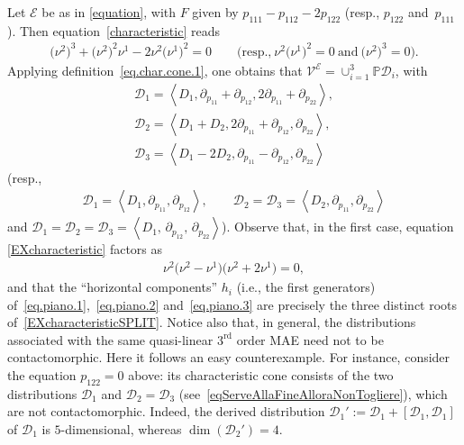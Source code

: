 \documentclass[10pt,a4paper]{amsart}
\newcommand{\D}{\mathcal{D}}
\newcommand{\M}{\mathcal{V}}
\newcommand{\E}{\mathcal{E}}
\newcommand{\Span}[1]{\left\langle #1 \right\rangle}
\renewcommand{\P}{\mathbb{P}}
\newcommand{\Rd}{^\textrm{rd}}
\newcommand{\w}{\nu}
\numberwithin{equation}{section}
\begin{document}
Let $\E$ be as in \eqref{equation}, with $F$ given by $p_{111}-p_{112}-2p_{122}$ (resp., $p_{122}$ and~$p_{111}$). Then equation~\eqref{characteristic} reads
\begin{gather}\label{EXcharacteristic}
\big(\w^2\big)^3+\big(\w^2\big)^2\w^1-2\w^2\big(\w^1\big)^2= 0\qquad \big(\textrm{resp.,} \ \w^2\big(\w^1\big)^2=0 \ \textrm{and}\ \big(\w^2\big)^3=0\big).
\end{gather}
Applying def\/inition~\eqref{eq.char.cone.1}, one obtains that $\M^\E=\cup_{i=1}^3\P\D_i$, with
\begin{gather}
\mathcal{D}_1 = \Span{ D_1 , \partial_{p_{11}}+\partial_{p_{12}}, 2\partial_{p_{11}}+\partial_{p_{22}}},\label{eq.piano.1}\\
\mathcal{D}_2 = \Span{ D_1 + D_2 ,2\partial_{p_{11}}+\partial_{p_{12}}, \partial_{p_{22}}},\label{eq.piano.2}\\
\mathcal{D}_3 = \Span{ D_1 - 2D_2 ,\partial_{p_{11}}-\partial_{p_{12}}, \partial_{p_{22}}}\label{eq.piano.3}
\end{gather}
(resp.,
 \begin{gather}
\mathcal{D}_1=\Span{ D_1,\partial_{p_{11}},\partial_{p_{12}}}, \qquad \mathcal{D}_2=\mathcal{D}_3=\Span{ D_2,\partial_{p_{11}},\partial_{p_{22}} }\label{eqServeAllaFineAlloraNonTogliere}
\end{gather}
and 
$
\mathcal{D}_1=\mathcal{D}_2=\mathcal{D}_3=\Span{ D_1,\,\partial_{p_{12}},\,\partial_{p_{22}} }
$).
Observe that, in the f\/irst case, equation \eqref{EXcharacteristic} factors as
\begin{gather}\label{EXcharacteristicSPLIT}
\w^2\big(\w^2-\w^1\big)\big(\w^2+2\w^1\big)=0,
\end{gather}
and that the ``horizontal components'' $h_i$ (i.e., the f\/irst generators) of~\eqref{eq.piano.1},~\eqref{eq.piano.2} and~\eqref{eq.piano.3} are precisely the three distinct roots of~\eqref{EXcharacteristicSPLIT}. Notice also that,
 in general, the distributions associated with the same quasi-linear $3\Rd$ order MAE need not to be contactomorphic. Here it follows an easy counterexample. For instance,
consider the equation $p_{122}=0$ above: its characteristic cone consists of the two distributions $\D_1$ and $\D_2=\D_3$ (see~\eqref{eqServeAllaFineAlloraNonTogliere}),
which are not contactomorphic. Indeed, the derived distribution $\D_1':=\D_1+[\D_1,\D_1]$ of $\D_1$ is $5$-dimensional, whereas $\dim(\D_2')=4$.
\end{document}
